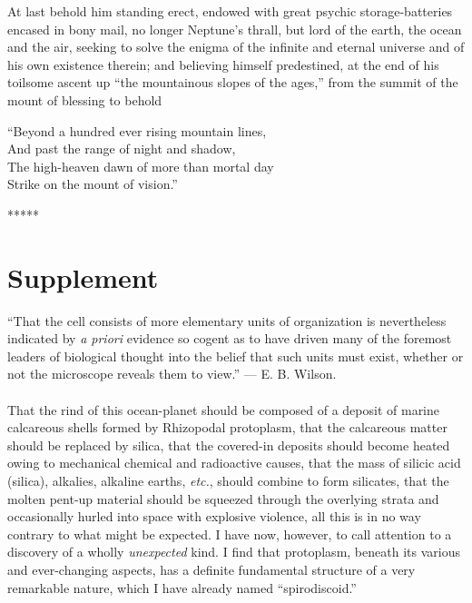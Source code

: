 \documentclass[a4paper, 12pt, oneside]{article}
\begin{document}
At last behold him standing erect, endowed with great psychic storage-batteries encased in bony mail, no longer Neptune's thrall, but lord of the earth, the ocean and the air, seeking to solve the enigma of the infinite and eternal universe and of his own existence therein; and believing himself predestined, at the end of his toilsome ascent up ``the mountainous slopes of the ages,'' from the summit of the mount of blessing to behold
\begin{displayquote}
``Beyond a hundred ever rising mountain lines,\\And past the range of night and shadow,\\The high-heaven dawn of more than mortal day\\Strike on the mount of vision.''
\end{displayquote}
\centerline{*\hspace{15mm}*\hspace{15mm}*\hspace{15mm}*\hspace{15mm}*}
\clearpage
\section{Supplement}
\begin{displayquote}
``That the cell consists of more elementary units of organization is nevertheless indicated by \emph{a priori} evidence so cogent as to have driven many of the foremost leaders of biological thought into the belief that such units must exist, whether or not the microscope reveals them to view.'' --- E. B. Wilson.
\end{displayquote}
\paragraph{}
That the rind of this ocean-planet should be composed of a deposit of marine calcareous shells formed by Rhizopodal protoplasm, that the calcareous matter should be replaced by silica, that the covered-in deposits should become heated owing to mechanical chemical and radioactive causes, that the mass of silicic acid (silica), alkalies, alkaline earths, \emph{etc.}, should combine to form silicates, that the molten pent-up material should be squeezed through the overlying strata and occasionally hurled into space with explosive violence, all this is in no way contrary to what might be expected. I have now, however, to call attention to a discovery of a wholly \emph{unexpected} kind. I find that protoplasm, beneath its various and ever-changing aspects, has a definite fundamental structure of a very remarkable nature, which I have already named ``spirodiscoid.''
\end{document}
